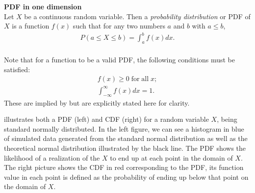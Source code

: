 \begin{definition}\label{def:PDF1d} \textbf{PDF in one dimension} \\
    Let $X$ be a continuous random variable. Then a \emph{probability distribution} or \gls{PDF} of $X$ is a function $f(x)$ such that for any two numbers $a$ and $b$ with $a \leq  b$,
        \begin{align*}
            P(a \leq X \leq b) = \int_a^bf(x)dx.\\
        \end{align*}
\end{definition}
\begin{remark}\label{rem:pdfProperties}
    Note that for a function to be a valid \gls{PDF}, the following conditions must be satisfied: 
    \begin{align*}
        f(x) \geq 0 \; \mathrm{ for\; all \;} x;\\
        \int_{-\infty}^{\infty}f(x)dx = 1. 
    \end{align*}
    These are implied by  but are explicitly stated here for clarity. 
\end{remark}


 illustrates both a \gls{PDF} (left) and \gls{CDF} (right) for a random variable $X$, being standard normally distributed. In the left figure, we can see a histogram in blue of simulated data generated from the standard normal distribution as well as the theoretical normal distribution illustrated by the black line. The \gls{PDF} shows the likelihood of a realization of the $X$ to end up at each point in the domain of $X$. The right picture shows the \gls{CDF} in red corresponding to the \gls{PDF}, its function value in each point is defined as the probability of ending up below that point on the domain of $X$.

